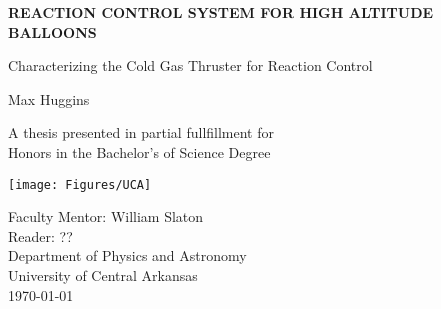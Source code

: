 \begin{titlepage}
    \begin{center}
        \vspace*{1cm}
            
        \large
        \textbf{REACTION CONTROL SYSTEM FOR HIGH ALTITUDE BALLOONS}
            
        \vspace{0.5cm}
        \normalsize
        Characterizing the Cold Gas Thruster for Reaction Control
            
        \vspace{1.5cm}
            
        Max Huggins\\
        

            
        \vfill
            
        A thesis presented in partial fullfillment for\\
        Honors in the Bachelor's of Science Degree
            
        \vspace{0.8cm}
            
        \texttt{[image: Figures/UCA]}
            
        Faculty Mentor: William Slaton\\
        Reader: ??\\
        Department of Physics and Astronomy\\
        University of Central Arkansas\\
        \today
            
    \end{center}
\end{titlepage}